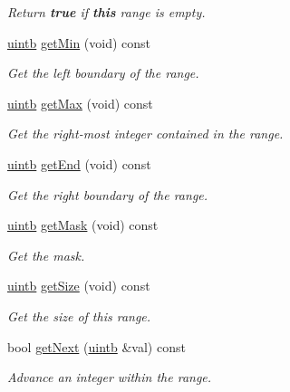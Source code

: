 \begin{DoxyCompactItemize}
\begin{DoxyCompactList}\small\item\em Return {\bfseries{true}} if {\bfseries{this}} range is empty. \end{DoxyCompactList}\item 
\mbox{\hyperlink{types_8h_a2db313c5d32a12b01d26ac9b3bca178f}{uintb}} \mbox{\hyperlink{class_circle_range_a4f3f3d4447720427b4a3e5c08da40a22}{get\+Min}} (void) const
\begin{DoxyCompactList}\small\item\em Get the left boundary of the range. \end{DoxyCompactList}\item 
\mbox{\hyperlink{types_8h_a2db313c5d32a12b01d26ac9b3bca178f}{uintb}} \mbox{\hyperlink{class_circle_range_ab7d87070d5438997797f5996246715f5}{get\+Max}} (void) const
\begin{DoxyCompactList}\small\item\em Get the right-\/most integer contained in the range. \end{DoxyCompactList}\item 
\mbox{\hyperlink{types_8h_a2db313c5d32a12b01d26ac9b3bca178f}{uintb}} \mbox{\hyperlink{class_circle_range_a57c77df53b7ce6f316044d14b6446028}{get\+End}} (void) const
\begin{DoxyCompactList}\small\item\em Get the right boundary of the range. \end{DoxyCompactList}\item 
\mbox{\hyperlink{types_8h_a2db313c5d32a12b01d26ac9b3bca178f}{uintb}} \mbox{\hyperlink{class_circle_range_ad159c5cf77ea4b8e923471499a6c79ad}{get\+Mask}} (void) const
\begin{DoxyCompactList}\small\item\em Get the mask. \end{DoxyCompactList}\item 
\mbox{\hyperlink{types_8h_a2db313c5d32a12b01d26ac9b3bca178f}{uintb}} \mbox{\hyperlink{class_circle_range_a606c680231a59b4439f17409d8c479e5}{get\+Size}} (void) const
\begin{DoxyCompactList}\small\item\em Get the size of this range. \end{DoxyCompactList}\item 
bool \mbox{\hyperlink{class_circle_range_a761580f8aa6158005bf278654fc21cd1}{get\+Next}} (\mbox{\hyperlink{types_8h_a2db313c5d32a12b01d26ac9b3bca178f}{uintb}} \&val) const
\begin{DoxyCompactList}\small\item\em Advance an integer within the range. \end{DoxyCompactList}\item 

\end{DoxyCompactItemize}
